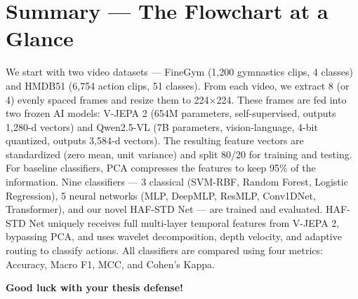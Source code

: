 \documentclass[12pt, a4paper]{article}
\begin{document}
\newpage
\section{Summary — The Flowchart at a Glance}

\begin{summarybox}
We start with two video datasets — FineGym (1,200 gymnastics clips, 4 classes) and HMDB51 (6,754 action clips, 51 classes). From each video, we extract 8 (or 4) evenly spaced frames and resize them to 224$\times$224. These frames are fed into two frozen AI models: V-JEPA 2 (654M parameters, self-supervised, outputs 1,280-d vectors) and Qwen2.5-VL (7B parameters, vision-language, 4-bit quantized, outputs 3,584-d vectors). The resulting feature vectors are standardized (zero mean, unit variance) and split 80/20 for training and testing. For baseline classifiers, PCA compresses the features to keep 95\% of the information. Nine classifiers — 3 classical (SVM-RBF, Random Forest, Logistic Regression), 5 neural networks (MLP, DeepMLP, ResMLP, Conv1DNet, Transformer), and our novel HAF-STD Net — are trained and evaluated. HAF-STD Net uniquely receives full multi-layer temporal features from V-JEPA 2, bypassing PCA, and uses wavelet decomposition, depth velocity, and adaptive routing to classify actions. All classifiers are compared using four metrics: Accuracy, Macro F1, MCC, and Cohen's Kappa.
\end{summarybox}

\begin{center}
\vspace{1cm}
\Large\bfseries\color{stageblue} Good luck with your thesis defense!
\end{center}
\end{document}
